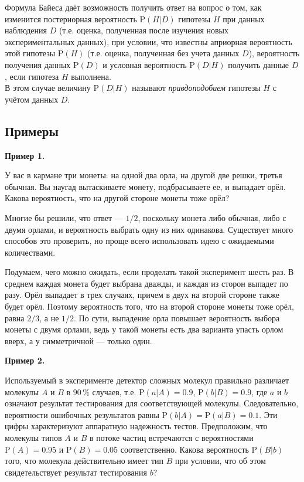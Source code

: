 \documentclass[11pt,a4paper]{article}
\begin{document}
Формула Байеса даёт возможность получить ответ на вопрос о том, как
изменится постериорная вероятность \(\mathrm{P}(H|D)\) гипотезы \(H\)
при данных наблюдения \(D\) (т.е. оценка, полученная после изучения
новых экспериментальных данных), при условии, что известны априорная
вероятность этой гипотезы \(\mathrm{P}(H)\) (т.е. оценка, полученная без
учета данных \(D\)), вероятность получения данных \(\mathrm{P}(D)\) и
условная вероятность \(\mathrm{P}(D|H)\) получить данные \(D\), если
гипотеза \(H\) выполнена.\\
В этом случае величину \(\mathrm{P}(D|H)\) называют
\emph{правдоподобием} гипотезы \(H\) с учётом данных \(D\).

    \hypertarget{ux43fux440ux438ux43cux435ux440ux44b}{%
\subsection{Примеры}\label{ux43fux440ux438ux43cux435ux440ux44b}}

\textbf{Пример 1.}

У вас в кармане три монеты: на одной два орла, на другой две решки,
третья обычная. Вы наугад вытаскиваете монету, подбрасываете ее, и
выпадает орёл. Какова вероятность, что на другой стороне монеты тоже
орёл?

Многие бы решили, что ответ --- \(1/2\), поскольку монета либо обычная,
либо с двумя орлами, и вероятность выбрать одну из них одинакова.
Существует много способов это проверить, но проще всего использовать
идею с ожидаемыми количествами.

Подумаем, чего можно ожидать, если проделать такой эксперимент шесть
раз. В среднем каждая монета будет выбрана дважды, и каждая из сторон
выпадет по разу. Орёл выпадает в трех случаях, причем в двух на второй
стороне также будет орёл. Поэтому вероятность того, что на второй
стороне монеты тоже орёл, равна \(2/3\), а не \(1/2\). По сути,
выпадение орла повышает вероятность выбора монеты с двумя орлами, ведь у
такой монеты есть два варианта упасть орлом вверх, а у симметричной ---
только один.

    \textbf{Пример 2.}

Используемый в эксперименте детектор сложных молекул правильно различает
молекулы \(A\) и \(B\) в \(90\,\%\) случаев, т.е.
\(\mathrm{P}(a|A) = 0.9\), \(\mathrm{P}(b|B) = 0.9\), где \(a\) и \(b\)
означают результат тестирования для соответствующей молекулы.
Следовательно, вероятности ошибочных результатов равны
\(\mathrm{P}(b|A) = \mathrm{P}(a|B) = 0.1\). Эти цифры характеризуют
аппаратную надежность тестов. Предположим, что молекулы типов \(A\) и
\(B\) в потоке частиц встречаются с вероятностями
\(\mathrm{P}(A) = 0.95\) и \(\mathrm{P}(B) = 0.05\) соответственно.
Какова вероятность \(\mathrm{P}(B|b)\) того, что молекула действительно
имеет тип \(B\) при условии, что об этом свидетельствует результат
тестирования \(b\)?
\end{document}
